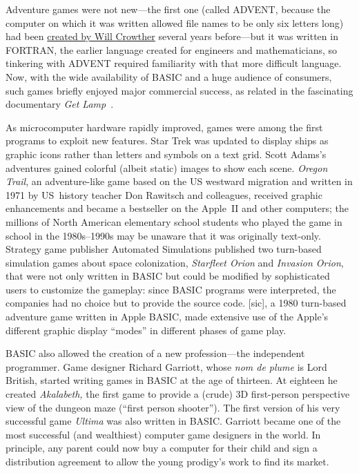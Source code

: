 \begin{tangent}
  Adventure games were not new---the first one (called ADVENT, because
  the computer on which it was written allowed file names to be only six
  letters long) had been
  \href{https://armandofox.blogspot.com/2007/08/the-original-original-adventure.html}{created
by Will Crowther} several years before---but it was written in
FORTRAN, the earlier language created for engineers and
mathematicians, so tinkering with ADVENT required familiarity with
that more difficult language.
Now, with the wide availability of BASIC and a huge audience of
consumers, such games briefly enjoyed major commercial success, as
related in the fascinating documentary \emph{Get
Lamp}~\cite{get_lamp}.
\end{tangent}

As microcomputer hardware rapidly improved,
games were among the first programs to exploit new features.
Star Trek was updated to display ships as graphic icons rather than
letters and symbols on a text grid.
Scott Adams's adventures gained colorful (albeit static) images to
show each scene.
\emph{Oregon Trail}, an adventure-like game based on the US westward
migration and written in 1971 by US~history teacher Don Rawitsch and colleagues,
received graphic enhancements and became
a bestseller on the Apple~II and other computers;
the millions of
North American elementary school students who played the game in school
in the 1980s--1990s
may be unaware that it was originally text-only.
Strategy game publisher
Automated Simulations published two turn-based simulation games about
space colonization,
\emph{Starfleet Orion} and \emph{Invasion Orion}, that were not only
written in BASIC but could be modified by sophisticated users to
customize the gameplay: since BASIC programs were interpreted, the
companies had no choice but to provide the source code.
 [sic], a 1980 turn-based adventure game
written in Apple BASIC,
made extensive use of the Apple's different graphic display ``modes''
in different phases of game play.


BASIC also allowed the creation of a new profession---the independent
programmer.
Game designer Richard Garriott, whose \emph{nom de plume} is Lord
British, started writing games in BASIC at the age of thirteen.
At eighteen he created
\emph{Akalabeth,} the first game to provide a (crude) 3D first-person
perspective view of the dungeon maze (``first person shooter'').
The first version of his very
successful game \emph{Ultima} was also written in BASIC.
Garriott became one of the most successful (and wealthiest)
computer game designers in the world.
In principle, any parent could now buy a computer for their child and
sign a distribution agreement to allow the young prodigy's work to
find its market.

